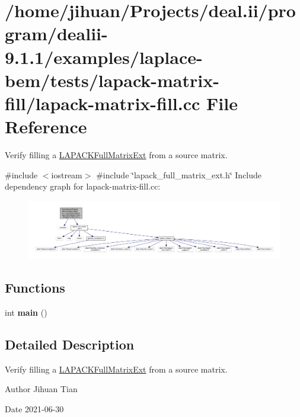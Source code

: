 \hypertarget{lapack-matrix-fill_8cc}{}\section{/home/jihuan/\+Projects/deal.ii/program/dealii-\/9.1.1/examples/laplace-\/bem/tests/lapack-\/matrix-\/fill/lapack-\/matrix-\/fill.cc File Reference}
\label{lapack-matrix-fill_8cc}


Verify filling a \hyperlink{classLAPACKFullMatrixExt}{L\+A\+P\+A\+C\+K\+Full\+Matrix\+Ext} from a source matrix.  


{\ttfamily \#include $<$iostream$>$}\newline
{\ttfamily \#include \char`\"{}lapack\+\_\+full\+\_\+matrix\+\_\+ext.\+h\char`\"{}}\newline
Include dependency graph for lapack-\/matrix-\/fill.cc\+:\nopagebreak
\begin{figure}[H]
\begin{center}
\leavevmode
\includegraphics[width=350pt]{lapack-matrix-fill_8cc__incl}
\end{center}
\end{figure}
\subsection*{Functions}
\begin{DoxyCompactItemize}
\item 
\mbox{\label{lapack-matrix-fill_8cc_ae66f6b31b5ad750f1fe042a706a4e3d4}} 
int {\bfseries main} ()
\end{DoxyCompactItemize}


\subsection{Detailed Description}
Verify filling a \hyperlink{classLAPACKFullMatrixExt}{L\+A\+P\+A\+C\+K\+Full\+Matrix\+Ext} from a source matrix. 

\begin{DoxyAuthor}{Author}
Jihuan Tian 
\end{DoxyAuthor}
\begin{DoxyDate}{Date}
2021-\/06-\/30 
\end{DoxyDate}

